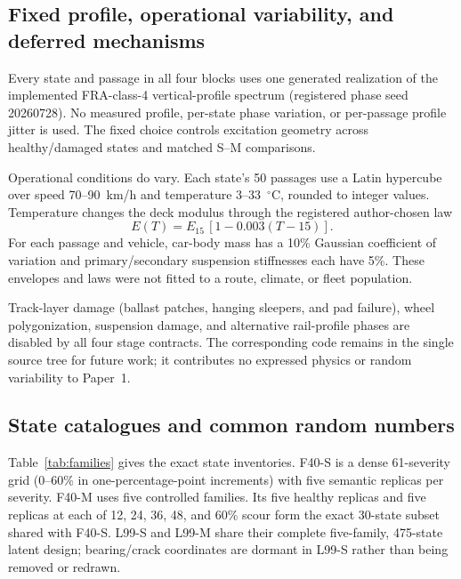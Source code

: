 \subsection{Fixed profile, operational variability, and deferred mechanisms}
\label{sec:opvar}

Every state and passage in all four blocks uses one generated realization of
the implemented FRA-class-4 vertical-profile spectrum (registered phase seed
20260728). No measured profile, per-state phase variation, or per-passage
profile jitter is used. The fixed choice controls excitation geometry across
healthy/damaged states and matched S--M comparisons.

Operational conditions do vary. Each state's 50 passages use a Latin
hypercube over speed 70--90~km/h and temperature 3--33~$^{\circ}$C, rounded to
integer values. Temperature changes the deck modulus through the registered
author-chosen law
\[
 E(T)=E_{15}\,[1-0.003(T-15)].
\]
For each passage and vehicle, car-body mass has a 10\% Gaussian coefficient of
variation and primary/secondary suspension stiffnesses each have 5\%. These
envelopes and laws were not fitted to a route, climate, or fleet population.

Track-layer damage (ballast patches, hanging sleepers, and pad failure), wheel
polygonization, suspension damage, and alternative rail-profile phases are
disabled by all four stage contracts. The corresponding code remains in the
single source tree for future work; it contributes no expressed physics or
random variability to Paper~1.

\subsection{State catalogues and common random numbers}
\label{sec:states}

Table~\ref{tab:families} gives the exact state inventories. F40-S is a dense
61-severity grid (0--60\% in one-percentage-point increments) with five
semantic replicas per severity. F40-M uses five controlled families. Its five
healthy replicas and five replicas at each of 12, 24, 36, 48, and 60\% scour
form the exact 30-state subset shared with F40-S. L99-S and L99-M share their
complete five-family, 475-state latent design; bearing/crack coordinates are
dormant in L99-S rather than being removed or redrawn.

